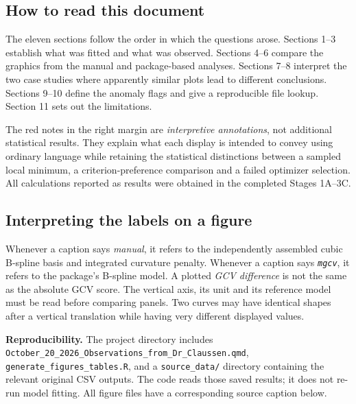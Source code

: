 \documentclass[10pt,letterpaper]{article}
\begin{document}
\subsection{How to read this document}
The eleven sections follow the order in which the questions arose. Sections 1--3 establish what was fitted and what was observed. Sections 4--6 compare the graphics from the manual and package-based analyses. Sections 7--8 interpret the two case studies where apparently similar plots lead to different conclusions. Sections 9--10 define the anomaly flags and give a reproducible file lookup. Section 11 sets out the limitations.

The red notes in the right margin are \emph{interpretive annotations}, not additional statistical results. They explain what each display is intended to convey using ordinary language while retaining the statistical distinctions between a sampled local minimum, a criterion-preference comparison and a failed optimizer selection. All calculations reported as results were obtained in the completed Stages 1A--3C.

\subsection{Interpreting the labels on a figure}
Whenever a caption says \emph{manual}, it refers to the independently assembled cubic B-spline basis and integrated curvature penalty. Whenever a caption says \emph{\texttt{mgcv}}, it refers to the package's B-spline model. A plotted \emph{GCV difference} is not the same as the absolute GCV score. The vertical axis, its unit and its reference model must be read before comparing panels. Two curves may have identical shapes after a vertical translation while having very different displayed values.


\noindent\textbf{Reproducibility.} The project directory includes \texttt{October\_20\_2026\_Observations\_from\_Dr\_Claussen.qmd}, \texttt{generate\_figures\_tables.R}, and a \texttt{source\_data/} directory containing the relevant original CSV outputs. The code reads those saved results; it does not re-run model fitting. All figure files have a corresponding source caption below.
\end{document}
